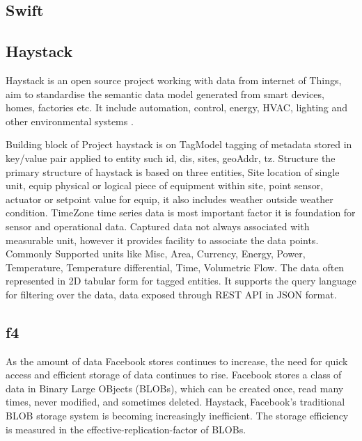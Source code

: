 {\subsection{Swift}

\pv

\subsection{Haystack}

     Haystack is an open source project working with data from
     internet of Things, aim to standardise the semantic data model
     generated from smart devices, homes, factories etc.  It include
     automation, control, energy, HVAC, lighting and other
     environmental systems  \cite{www-project-haystack}.
     
     Building block of Project haystack is on TagModel tagging of
     metadata stored in key/value pair applied to entity such id, dis,
     sites, geoAddr, tz. Structure the primary structure of haystack
     is based on three entities, Site location of single unit, equip
     physical or logical piece of equipment within site, point sensor,
     actuator or setpoint value for equip, it also includes weather
     outside weather condition. TimeZone time series data is most
     important factor it is foundation for sensor and operational
     data. Captured data not always associated with measurable unit,
     however it provides facility to associate the data points.
     Commonly Supported units like Misc, Area, Currency, Energy,
     Power, Temperature, Temperature differential, Time, Volumetric
     Flow. The data often represented in 2D tabular form for tagged
     entities. It supports the query language for filtering over the
     data, data exposed through REST API in JSON format.

     \pv

\subsection{f4}
     
     As the amount of data Facebook stores continues to increase, the
     need for quick access and efficient storage of data continues to
     rise.  Facebook stores a class of data in Binary Large OBjects
     (BLOBs), which can be created once, read many times, never
     modified, and sometimes deleted. Haystack, Facebook’s traditional
     BLOB storage system is becoming increasingly inefficient. The
     storage efficiency is measured in the
     effective-replication-factor of BLOBs.

}
